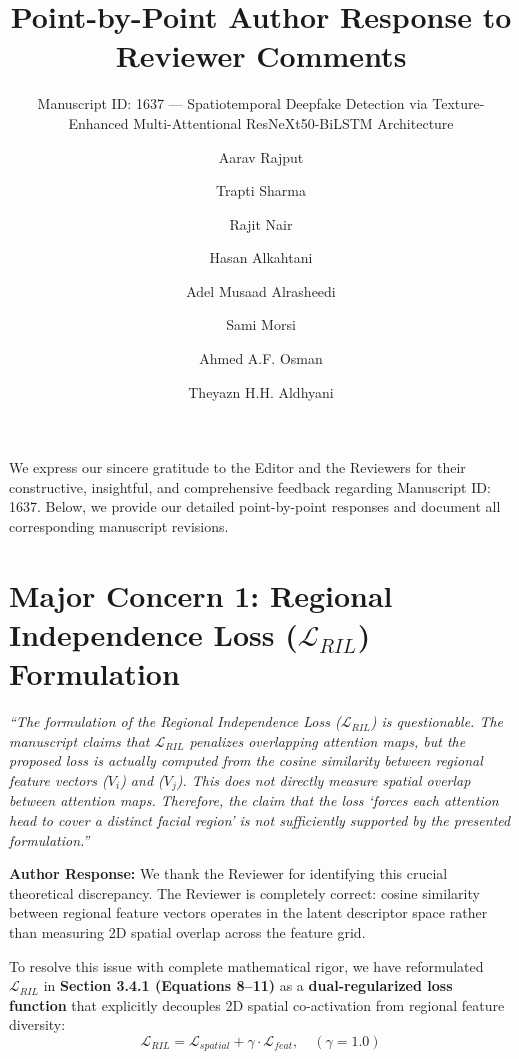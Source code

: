 \documentclass[runningheads]{llncs}
\begin{document}
\title{Point-by-Point Author Response to Reviewer Comments}
\subtitle{Manuscript ID: 1637 --- Spatiotemporal Deepfake Detection via Texture-Enhanced Multi-Attentional ResNeXt50-BiLSTM Architecture}
\author{Aarav Rajput \and Trapti Sharma \and Rajit Nair \and Hasan Alkahtani \and Adel Musaad Alrasheedi \and Sami Morsi \and Ahmed A.F. Osman \and Theyazn H.H. Aldhyani}
\institute{}
\maketitle

We express our sincere gratitude to the Editor and the Reviewers for their constructive, insightful, and comprehensive feedback regarding Manuscript ID: 1637. Below, we provide our detailed point-by-point responses and document all corresponding manuscript revisions.

\section*{Major Concern 1: Regional Independence Loss ($\mathcal{L}_{RIL}$) Formulation}

\begin{tcolorbox}[colback=gray!10,colframe=gray!50,title=\textbf{Reviewer Comment 1}]
\textit{``The formulation of the Regional Independence Loss ($\mathcal{L}_{RIL}$) is questionable. The manuscript claims that $\mathcal{L}_{RIL}$ penalizes overlapping attention maps, but the proposed loss is actually computed from the cosine similarity between regional feature vectors ($V_i$) and ($V_j$). This does not directly measure spatial overlap between attention maps. Therefore, the claim that the loss `forces each attention head to cover a distinct facial region' is not sufficiently supported by the presented formulation.''}
\end{tcolorbox}

\noindent\textbf{Author Response:} We thank the Reviewer for identifying this crucial theoretical discrepancy. The Reviewer is completely correct: cosine similarity between regional feature vectors operates in the latent descriptor space rather than measuring 2D spatial overlap across the feature grid.

To resolve this issue with complete mathematical rigor, we have reformulated $\mathcal{L}_{RIL}$ in \textbf{Section 3.4.1 (Equations 8--11)} as a \textbf{dual-regularized loss function} that explicitly decouples 2D spatial co-activation from regional feature diversity:
\begin{equation}
    \mathcal{L}_{RIL} = \mathcal{L}_{spatial} + \gamma \cdot \mathcal{L}_{feat}, \quad (\gamma = 1.0)
\end{equation}
\end{document}
